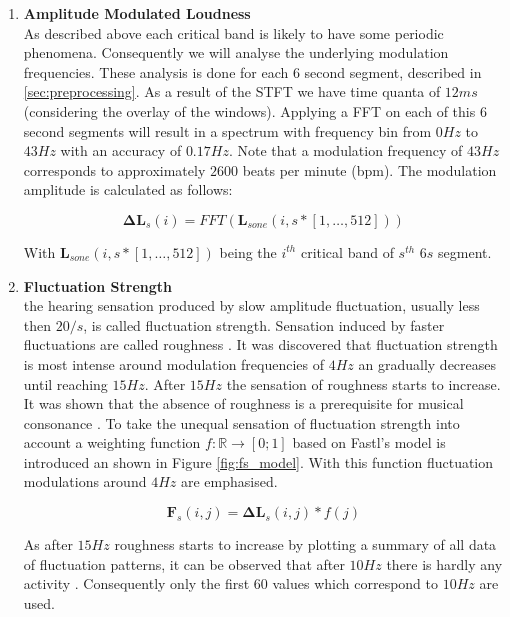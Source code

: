 \documentclass[cic,tc,english]{iiufrgs}
\begin{document}
\begin{enumerate}
\item \textbf{Amplitude Modulated Loudness} \\ As described above each critical band is likely to have some periodic phenomena. Consequently we will analyse the underlying modulation frequencies. These analysis is done for each 6 second segment, described in \ref{sec:preprocessing}. As a result of the STFT we have time quanta of $12ms$ (considering the overlay of the windows). Applying a FFT on each of this 6 second segments will result in a spectrum with frequency bin from $0Hz$ to $43Hz$ with an accuracy of $0.17Hz$. Note that a modulation frequency of $43Hz$ corresponds to approximately $2600$ beats per minute (bpm). The modulation amplitude is calculated as follows:

\begin{equation}
\bm{\Delta L}_s(i) = FFT(\bm{L}_{sone}(i,s*[1, \ldots, 512]))
\end{equation}

With $\bm{L}_{sone}(i,s*[1, \ldots, 512])$ being the $i^{th}$ critical band of $s^{th}$ $6s$ segment.

\item \textbf{Fluctuation Strength} \\ the hearing sensation produced by slow amplitude fluctuation, usually less then $20/s$,  is called fluctuation strength. Sensation induced by faster fluctuations are called roughness \cite{fastl1982fluctuation}. It was discovered that fluctuation strength is most intense around modulation frequencies of $4Hz$ an gradually decreases until reaching $15Hz$. After $15Hz$ the sensation of roughness starts to increase. It was shown that the absence of roughness is a prerequisite for musical consonance \cite{fastl1982fluctuation}. To take the unequal sensation of fluctuation strength into account a weighting function $f:\mathbb{R} \rightarrow [0;1]$ based on Fastl's model is introduced an shown in Figure \ref{fig:fs_model}. With this function fluctuation modulations around $4Hz$ are emphasised. 

\begin{equation}
\bm{F}_s(i,j) = \bm{\Delta L}_s(i,j) * f(j)
\end{equation}

As after $15Hz$ roughness starts to increase by plotting a summary of all data of fluctuation patterns, it can be observed that after $10Hz$ there is hardly any activity \cite{pampalk2001islands}. Consequently only the first $60$ values which correspond to $10Hz$ are used.


\end{enumerate}
\end{document}
